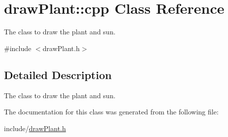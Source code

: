 \hypertarget{classdrawPlant_1_1cpp}{
\section{drawPlant::cpp Class Reference}
\label{classdrawPlant_1_1cpp}
}


The class to draw the plant and sun.  


{\ttfamily \#include $<$drawPlant.h$>$}

\subsection{Detailed Description}
The class to draw the plant and sun. 

The documentation for this class was generated from the following file:\begin{DoxyCompactItemize}
\item 
include/\hyperlink{drawPlant_8h}{drawPlant.h}\end{DoxyCompactItemize}
